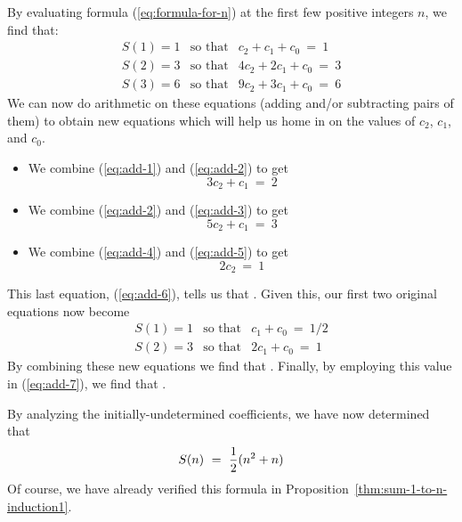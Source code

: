 \smallskip

\noindent By evaluating formula (\ref{eq:formula-for-n}) at the first few positive integers $n$, we find that:
\begin{eqnarray}
\label{eq:add-1}
S(1) = 1
 & \mbox{so that} &
 c_2 + c_1 + c_0 \ = \ 1 \\
\label{eq:add-2}
S(2) = 3
 & \mbox{so that} &
 4 c_2 + 2 c_1 + c_0 \ = \ 3 \\
\label{eq:add-3}
S(3) = 6
 & \mbox{so that} &
 9 c_2 + 3 c_1 + c_0 \ = \ 6
\end{eqnarray}
We can now do arithmetic on these equations (adding and/or subtracting pairs of them) to obtain new equations which will help us home in on the values of $c_2$, $c_1$, and $c_0$.
\begin{itemize}
\item
We combine (\ref{eq:add-1}) and (\ref{eq:add-2}) to get
\begin{equation}
\label{eq:add-4}
3c_2 + c_1 \ = \ 2
\end{equation}

\item
We combine (\ref{eq:add-2}) and (\ref{eq:add-3}) to get
\begin{equation}
\label{eq:add-5}
5 c_2 + c_1 \ = \ 3
\end{equation}

\item
We combine (\ref{eq:add-4}) and (\ref{eq:add-5}) to get
\begin{equation}
\label{eq:add-6}
2 c_2 \ = \ 1
\end{equation}
\end{itemize}
This last equation, (\ref{eq:add-6}), tells us that .  Given this, our first two original equations now become
\begin{eqnarray}
\label{eq:add-7}
S(1) = 1
 & \mbox{so that} &
c_1 + c_0 \ = \ 1/2 \\
\label{eq:add-8}
S(2) = 3
 & \mbox{so that} &
2 c_1 + c_0 \ = \ 1
\end{eqnarray}
By combining these new equations we find that .  Finally, by employing this value in (\ref{eq:add-7}), we find that .

\medskip

\noindent
By analyzing the initially-undetermined coefficients, we have now determined that
\[ S(n) \ = \ {1 \over 2}(n^2 + n) \]
Of course, we have already verified this formula in Proposition~\ref{thm:sum-1-to-n-induction1}.

